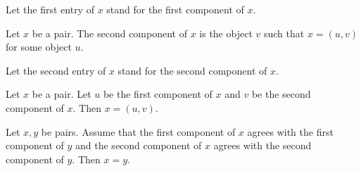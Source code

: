 \documentclass[../../set-theory.tex]{subfiles}
\begin{document}
\begin{forthel}
    Let the first entry of $x$ stand for the first component of $x$.

    \begin{definition}
      Let $x$ be a pair.
      The second component of $x$ is the object $v$ such that $x = (u,v)$ for some object $u$.
    \end{definition}

    Let the second entry of $x$ stand for the second component of $x$.

    \begin{lemma}\label{SetTheory_01_05_160632}
      Let $x$ be a pair.
      Let $u$ be the first component of $x$ and $v$ be the second component of $x$.
      Then $x = (u,v)$.
    \end{lemma}

    \begin{lemma}\label{SetTheory_01_05_204699}
      Let $x,y$ be pairs.
      Assume that the first component of $x$ agrees with the first component of $y$ and the second component of $x$ agrees with the second component of $y$.
      Then $x = y$.
    \end{lemma}
  \end{forthel}
\end{document}
